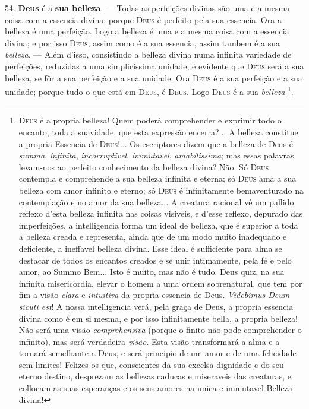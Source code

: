  54. \textbf{Deus} é a \textbf{sua belleza}. --- Todas as perfeições divinas são uma e a mesma coisa com a essencia divina; porque \textsc{Deus} é perfeito pela sua essencia. Ora a belleza é uma perfeição. Logo a belleza é uma e a mesma coisa com a essencia divina; e por isso \textsc{Deus}, assim como é a sua essencia, assim tambem é a sua \emph{belleza}. --- Além d'isso, consistindo a belleza divina numa infinita variedade de perfeições, reduzidas a uma simplicissima unidade, é evidente que \textsc{Deus} será a sua belleza, se fôr a sua perfeição e a sua unidade. Ora \textsc{Deus} é a sua perfeição e a sua unidade; porque tudo o que está em \textsc{Deus}, é \textsc{Deus}. Logo \textsc{Deus} é a sua \emph{belleza} \footnote{\textsc{Deus} é a propria belleza! Quem poderá comprehender e exprimir todo o encanto, toda a suavidade, que esta expressão encerra?... A belleza constitue a propria Essencia de \textsc{Deus}!... Os escriptores dizem que a belleza de Deus é \emph{summa}, \emph{infinita}, \emph{incorruptivel}, \emph{immutavel}, \emph{amabilissima}; mas essas palavras levam-nos ao perfeito conhecimento da belleza divina? Não. Só \textsc{Deus} contempla e comprehende a sua belleza infinita e eterna; só \textsc{Deus} ama a sua belleza com amor infinito e eterno; só \textsc{Deus} é infinitamente bemaventurado na contemplação e no amor da sua belleza... A creatura racional vê um pallido reflexo d'esta belleza infinita nas coisas visiveis, e d'esse reflexo, depurado das imperfeições, a intelligencia forma um ideal de belleza, que é superior a toda a belleza creada e representa, ainda que de um modo muito inadequado e deficiente, a ineffavel belleza divina. Esse ideal é sufficiente para alma se destacar de todos os encantos creados e se unir intimamente, pela fé e pelo amor, ao Summo Bem... Isto é muito, mas não é tudo. Deus quiz, na sua infinita misericordia, elevar o homem a uma ordem sobrenatural, que tem por fim a visão \emph{clara} e \emph{intuitiva} da propria essencia de Deus. \emph{Videbimus Deum sicuti est}! A nossa intelligencia verá, pela graça de Deus, a propria essencia divina como é em si mesma, e por isso infinitamente bella, a propria belleza! Não será uma visão \emph{comprehensiva} (porque o finito não pode comprehender o infinito), mas será verdadeira \emph{visão}. Esta visão transformará a alma e a tornará semelhante a Deus, e será principio de um amor e de uma felicidade sem limites! Felizes os que, conscientes da sua excelsa dignidade e do seu eterno destino, desprezam as bellezas caducas e miseraveis das creaturas, e collocam as suas esperanças e os seus amores na unica e immutavel Belleza divina!}.

